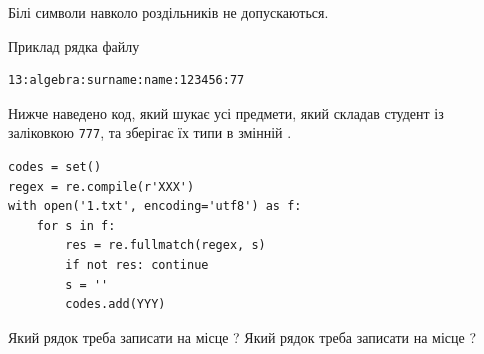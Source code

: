 \documentclass[12pt, ukrainian]{article}
\def\code#1{\Verb!#1!}
\begin{document}
{Білі символи навколо роздільників не допускаються.

Приклад рядка файлу



\begin{verbatim}
13:algebra:surname:name:123456:77
\end{verbatim}


Нижче наведено код, який шукає усі предмети, який складав студент із заліковкою \code{777}, та зберігає їх типи в змінній .



\begin{verbatim}
codes = set()
regex = re.compile(r'XXX')
with open('1.txt', encoding='utf8') as f:
    for s in f:
        res = re.fullmatch(regex, s)
        if not res: continue
        s = ''
        codes.add(YYY)
\end{verbatim}



Який рядок треба записати на місце  ?
Який рядок треба записати на місце  ?\par

}
\newpage
\end{document}
